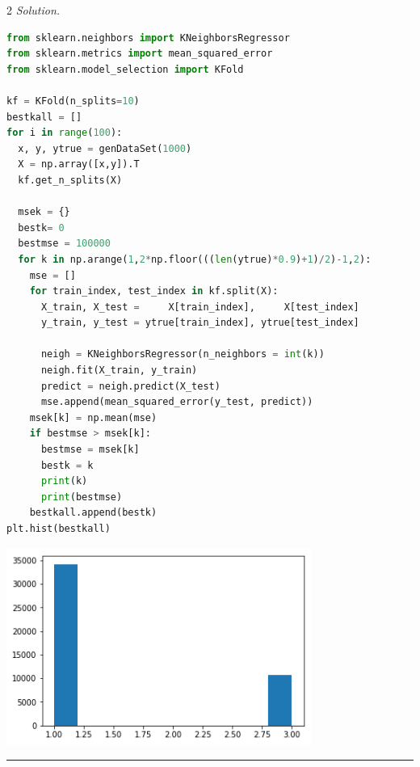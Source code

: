 \documentclass[12pt]{article}
\newcommand{\spacingfactor}{2}
\newcommand\myqed{}                 %
\newcommand{\printmyqed}[1][]       %
  {%
  \ifthenelse{\equal{#1}{Proof}}
  {\renewcommand{\myqed}{\qed}}
  {\renewcommand{\myqed}{}}
  }
\newenvironment{response}[1][\textit{Solution}]{%
  \printmyqed[#1]
  \begin{spacing}{\spacingfactor}
  \medskip                          %
  \noindent \textit{#1.}}{\myqed\end{spacing}\medskip\hrule}
\begin{document}
\begin{response}[Solution] 
  \lstset{language=Python,frame=single}
  \begin{lstlisting}[language=Python,frame=single]
from sklearn.neighbors import KNeighborsRegressor
from sklearn.metrics import mean_squared_error
from sklearn.model_selection import KFold

kf = KFold(n_splits=10)
bestkall = []
for i in range(100):
  x, y, ytrue = genDataSet(1000)
  X = np.array([x,y]).T
  kf.get_n_splits(X)
  
  msek = {}
  bestk= 0
  bestmse = 100000
  for k in np.arange(1,2*np.floor(((len(ytrue)*0.9)+1)/2)-1,2):
    mse = []
    for train_index, test_index in kf.split(X):
      X_train, X_test =     X[train_index],     X[test_index]
      y_train, y_test = ytrue[train_index], ytrue[test_index]
      
      neigh = KNeighborsRegressor(n_neighbors = int(k))
      neigh.fit(X_train, y_train) 
      predict = neigh.predict(X_test) 
      mse.append(mean_squared_error(y_test, predict))
    msek[k] = np.mean(mse)
    if bestmse > msek[k]:
      bestmse = msek[k]
      bestk = k
      print(k)
      print(bestmse)
    bestkall.append(bestk)
plt.hist(bestkall)
  \end{lstlisting}
  \includegraphics[width=100mm]{2.png} 
\end{response}


\end{document}
